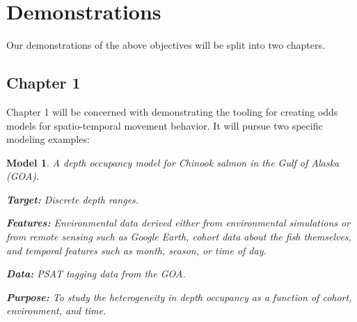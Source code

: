 \documentclass[11pt]{article}
\newtheorem{model}{Model}
\begin{document}
\newpage


















\section{Demonstrations}

Our demonstrations of the above objectives will be split into two chapters. 

\subsection{Chapter 1}

Chapter 1 will be concerned with demonstrating the tooling for creating odds models for spatio-temporal movement behavior. It will pursue two specific modeling examples:

\begin{model}
A depth occupancy model for Chinook salmon in the Gulf of Alaska (GOA). \newline

\textbf{Target:} Discrete depth ranges. \newline

\textbf{Features:} Environmental data derived either from environmental simulations or from remote sensing such as Google Earth, cohort data about the fish themselves, and temporal features such as month, season, or time of day. \newline

\textbf{Data:} PSAT tagging data from the GOA. \newline 

\textbf{Purpose:} To study the heterogeneity in depth occupancy as a function of cohort, environment, and time.  
\end{model}
\end{document}
